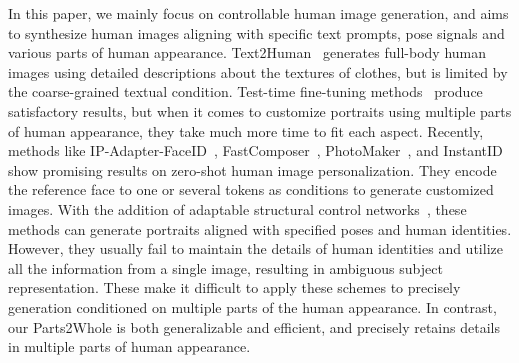 In this paper, we mainly focus on controllable human image generation, and aims to synthesize human images aligning with specific text prompts, pose signals and various parts of human appearance. Text2Human~\cite{jiang2022text2human} generates full-body human images using detailed descriptions about the textures of clothes, but is limited by the coarse-grained textual condition. Test-time fine-tuning methods~\cite{ruiz2023dreambooth,hu2021lora,kumari2023customdiffusion} produce satisfactory results, but when it comes to customize portraits using multiple parts of human appearance, they take much more time to fit each aspect. Recently, methods like IP-Adapter-FaceID~\cite{ye2023ipadapter}, FastComposer~\cite{xiao2023fastcomposer}, PhotoMaker~\cite{li2023photomaker}, and InstantID~\cite{wang2024instantid} show promising results on zero-shot human image personalization. They encode the reference face to one or several tokens as conditions to generate customized images. With the addition of adaptable structural control networks~\cite{zhang2023controlnet, mou2023t2iadapter}, these methods can generate portraits aligned with specified poses and human identities. However, they usually fail to maintain the details of human identities and utilize all the information from a single image, resulting in ambiguous subject representation. These make it difficult to apply these schemes to precisely generation conditioned on multiple parts of the human appearance. In contrast, our Parts2Whole is both generalizable and efficient, and precisely retains details in multiple parts of human appearance.